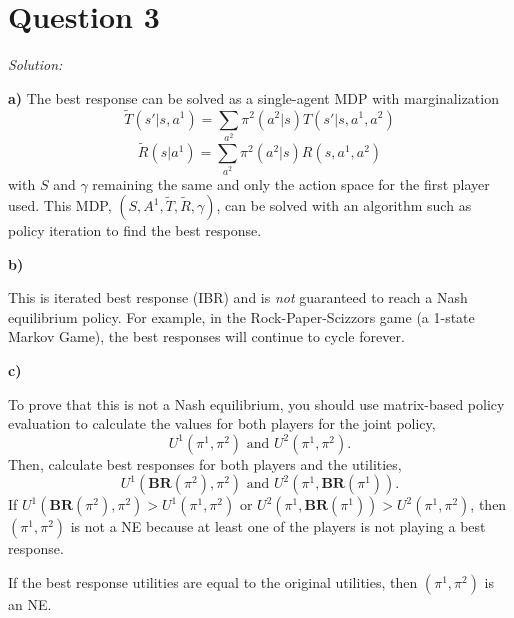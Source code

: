 \documentclass{article}
\theoremstyle{definition}
\newenvironment{solution}{\noindent\textit{Solution:}}{}
\begin{document}
\section*{Question 3}
\begin{solution}

\textbf{a)}
The best response can be solved as a single-agent MDP with marginalization
\[
\tilde{T}(s'|s,a^1) = \sum_{a^2} \pi^2(a^2 | s ) T(s' |s, a^1, a^2)
\]
\[
\tilde{R}(s|a^1) = \sum_{a^2} \pi^2(a^2 | s )R(s, a^1, a^2)
\]
with $S$ and $\gamma$ remaining the same and only the action space for the first player used. This MDP, $(S, A^1, \tilde{T}, \tilde{R}, \gamma)$, can be solved with an algorithm such as policy iteration to find the best response.



\textbf{b)}

This is iterated best response (IBR) and is \emph{not} guaranteed to reach a Nash equilibrium policy. For example, in the Rock-Paper-Scizzors game (a 1-state Markov Game), the best responses will continue to cycle forever.

\textbf{c)}


To prove that this is not a Nash equilibrium, you should use matrix-based policy evaluation to calculate the values for both players for the joint policy, $$U^1(\pi^1, \pi^2) \text{ and } U^2(\pi^1, \pi^2).$$ Then, calculate best responses for both players and the utilities, $$U^1(\mathbf{BR}(\pi^2), \pi^2) \text{ and } U^2(\pi^1, \mathbf{BR}(\pi^1)).$$ If $U^1(\mathbf{BR}(\pi^2), \pi^2) > U^1(\pi^1, \pi^2)$ or $U^2(\pi^1, \mathbf{BR}(\pi^1)) > U^2(\pi^1, \pi^2)$, then $(\pi^1, \pi^2)$ is not a NE because at least one of the players is not playing a best response.

If the best response utilities are equal to the original utilities, then $(\pi^1, \pi^2)$ is an NE.


\end{solution}
\end{document}
